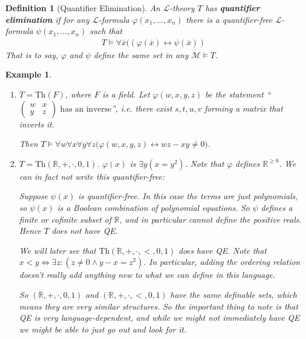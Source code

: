 \documentclass[]{article}
\theoremstyle{custhm}
\theoremstyle{cusdef}
\newtheorem{defin}[theorem]{Definition}
\theoremstyle{custhm}
\theoremstyle{custhm}
\theoremstyle{custhm}
\theoremstyle{ex}
\newtheorem{ex}[theorem]{Example}
\theoremstyle{custhm}
\theoremstyle{cusdef}
\theoremstyle{remark}
\newcommand{\R}{\mathbb{R}}
\newcommand{\undf}[1]{\textit{\textbf{#1}}}
\renewcommand{\L}{\mathcal{L}}
\renewcommand{\it}[1]{\textit{#1}}
\newcommand{\M}{\mathcal{M}}
\renewcommand{\phi}{\varphi}
\renewcommand{\bar}{\overline}
\newcommand{\Th}{\textrm{Th}}
\begin{document}
\begin{defin}[Quantifier Elimination]
An $\L$-theory $T$ has \undf{quantifier elimination} if for any $\L$-formula $\phi(x_1,\dots,x_n)$ there is a quantifier-free $\L$-formula $\psi(x_1,\dots,x_n)$ such that
\begin{align*}
T\models \forall \bar{x}\big((\phi(\bar{x})\leftrightarrow \psi(\bar{x}))
\end{align*}
That is to say, $\phi$ and $\psi$ define the same set in any $\M\models T$.
\end{defin}

\begin{ex}\ 
\begin{enumerate}[label=(\arabic*)]
\item $T = \Th(F)$, where $F$ is a field. Let $\phi(w,x,y,z)$ be the statement ``$\left(\begin{array}{cc} w & x\\ y & z\end{array}\right)\textrm{ has an inverse}$'', {\it i.e.} there exist $s,t,u,v$ forming a matrix that inverts it.

Then $T\models \forall w\forall x\forall y\forall z\big(\phi(w,x,y,z)\leftrightarrow wz-xy\ne 0\big)$.


\item $T = \Th(\R,+,\cdot,0,1)$. $\phi(x)$ is $\exists y(x = y^2)$. Note that $\phi$ defines $\R^{\ge 0}$. We can in fact not write this quantifier-free:

Suppose $\psi(x)$ is quantifier-free. In this case the terms are just polynomials, so $\psi(x)$ is a Boolean combination of polynomial equations. So $\psi$ defines a finite or cofinite subset of $\R$, and in particular cannot define the positive reals. Hence $T$ does not have QE.

We will later see that $\Th(\R,+,\cdot,<,0,1)$ {\it does} have QE. Note that $x < y \iff \exists z: (z\ne 0 \land y-x = z^2)$. In particular, adding the ordering relation doesn't really add anything new to what we can define in this language.

So $(\R,+,\cdot,0,1)$ and $(\R,+,\cdot,<,0,1)$ have the same definable sets, which means they are very similar structures. So the important thing to note is that QE is very language-dependent, and while we might not immediately have QE we might be able to just go out and look for it.
\end{enumerate}
\end{ex}
\end{document}
